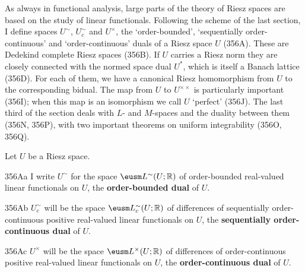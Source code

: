
\def\chaptername{Riesz spaces}
\def\sectionname{Dual spaces}


As always in functional analysis, large parts of the theory of Riesz
spaces are based on the study of linear functionals.   Following the
scheme of the last section, I define spaces $U^{\sim}$, $U^{\sim}_c$ and
$U^{\times}$, the `order-bounded', `sequentially order-continuous'
and `order-continuous' duals of a Riesz space $U$ (356A).   These are
Dedekind complete Riesz spaces (356B).   If $U$ carries a Riesz norm
they are closely connected with the normed space dual $U^*$, which is
itself a Banach lattice (356D).   For each of them, we have a canonical
Riesz homomorphism from $U$ to the corresponding bidual.   The map from
$U$ to $U^{\times\times}$ is particularly
important (356I);   when this map is an isomorphism we call $U$
`perfect' (356J).   The last third of the section deals with $L$- and
$M$-spaces and the duality between them (356N, 356P), with two important
theorems on uniform integrability (356O, 356Q).

 Let $U$ be a Riesz space.

\spheader 356Aa I write $U^{\sim}$ for the space
$\eusm L^{\sim}(U;\Bbb R)$ of order-bounded real-valued linear functionals on $U$, the {\bf order-bounded dual} of $U$.

\spheader 356Ab $U^{\sim}_c$ will be the space $\eusm L^{\sim}_c(U;\Bbb
R)$ of differences of sequentially order-continuous positive real-valued
linear functionals on $U$, the {\bf sequentially order-continuous dual}
of $U$.

\spheader 356Ac $U^{\times}$ will be the space $\eusm L^{\times}(U;\Bbb
R)$ of differences of order-continuous positive real-valued linear
functionals on $U$, the {\bf order-continuous dual} of $U$.


